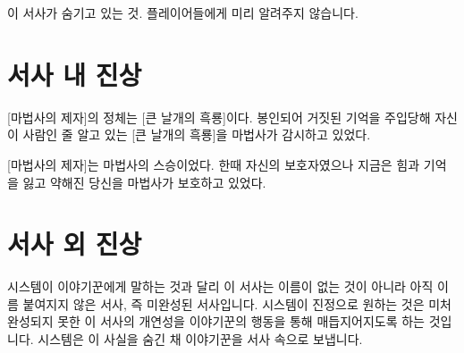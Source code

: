 \documentclass{report}
\begin{document}
이 서사가 숨기고 있는 것. 플레이어들에게 미리 알려주지 않습니다.

	\section{서사 내 진상}
		[마법사의 제자]의 정체는 [큰 날개의 흑룡]이다. 봉인되어 거짓된 기억을 주입당해 자신이 사람인 줄 알고 있는 [큰 날개의 흑룡]을 마법사가 감시하고 있었다.
		
		[마법사의 제자]는 마법사의 스승이었다. 한때 자신의 보호자였으나 지금은 힘과 기억을 잃고 약해진 당신을 마법사가 보호하고 있었다.
	
	\section{서사 외 진상}
		시스템이 이야기꾼에게 말하는 것과 달리 이 서사는 이름이 없는 것이 아니라 아직 이름 붙여지지 않은 서사, 즉 미완성된 서사입니다. 시스템이 진정으로 원하는 것은 미처 완성되지 못한 이 서사의 개연성을 이야기꾼의 행동을 통해 매듭지어지도록 하는 것입니다. 시스템은 이 사실을 숨긴 채 이야기꾼을 서사 속으로 보냅니다.
\end{document}
